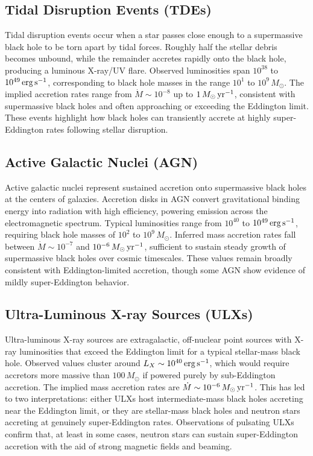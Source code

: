 \subsection{Tidal Disruption Events (TDEs)}
Tidal disruption events occur when a star passes close enough to a supermassive black hole to be torn 
apart by tidal forces. Roughly half the stellar debris becomes unbound, while the remainder accretes 
rapidly onto the black hole, producing a luminous X-ray/UV flare. Observed luminosities span 
$10^{38}$ to $10^{49}\,{\rm erg\,s^{-1}}$, corresponding to black hole masses in the range 
$10^{1}$ to $10^{9}\,M_\odot$. The implied accretion rates range from 
$\dot{M} \sim 10^{-8}$ up to $1\,M_\odot\,{\rm yr^{-1}}$, consistent with supermassive black holes 
and often approaching or exceeding the Eddington limit. These events highlight how black holes can 
transiently accrete at highly super-Eddington rates following stellar disruption.

\subsection{Active Galactic Nuclei (AGN)}
Active galactic nuclei represent sustained accretion onto supermassive black holes at the centers of 
galaxies. Accretion disks in AGN convert gravitational binding energy into radiation with high 
efficiency, powering emission across the electromagnetic spectrum. Typical luminosities range from 
$10^{40}$ to $10^{49}\,{\rm erg\,s^{-1}}$, requiring black hole masses of $10^{2}$ to $10^{9}\,M_\odot$. 
Inferred mass accretion rates fall between $\dot{M} \sim 10^{-7}$ and $10^{-6}\,M_\odot\,{\rm yr^{-1}}$, 
sufficient to sustain steady growth of supermassive black holes over cosmic timescales. These values 
remain broadly consistent with Eddington-limited accretion, though some AGN show evidence of mildly 
super-Eddington behavior.

\subsection{Ultra-Luminous X-ray Sources (ULXs)}
Ultra-luminous X-ray sources are extragalactic, off-nuclear point sources with X-ray luminosities that 
exceed the Eddington limit for a typical stellar-mass black hole. Observed values cluster around 
$L_X \sim 10^{40}\,{\rm erg\,s^{-1}}$, which would require accretors more massive than 
$100\,M_\odot$ if powered purely by sub-Eddington accretion. The implied mass accretion rates are 
$\dot{M} \sim 10^{-6}\,M_\odot\,{\rm yr^{-1}}$. This has led to two interpretations: either ULXs host 
intermediate-mass black holes accreting near the Eddington limit, or they are stellar-mass black holes 
and neutron stars accreting at genuinely super-Eddington rates. Observations of pulsating ULXs confirm 
that, at least in some cases, neutron stars can sustain super-Eddington accretion with the aid of strong 
magnetic fields and beaming.
